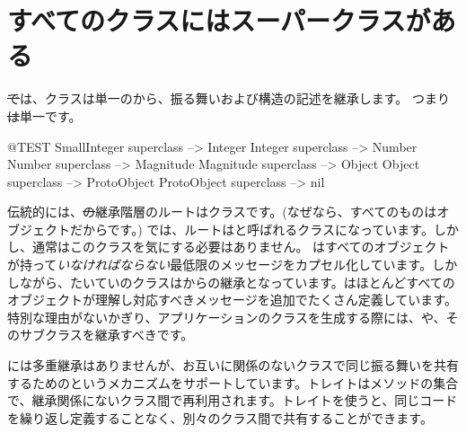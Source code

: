 \documentclass[a4paper,10pt,twoside]{book}
\begin{document}
\section{すべてのクラスにはスーパークラスがある}


\st では、クラスは単一のから、振る舞いおよび構造の記述を継承します。
つまり\st は単一です。

\begin{code}{@TEST}
SmallInteger superclass --> Integer
Integer superclass          --> Number
Number superclass        --> Magnitude
Magnitude superclass    --> Object
Object superclass           --> ProtoObject
ProtoObject superclass  --> nil
\end{code}

伝統的には、\st の継承階層のルートはクラスです。(なぜなら、すべてのものはオブジェクトだからです。)
\pharo では、ルートはと呼ばれるクラスになっています。しかし、通常はこのクラスを気にする必要はありません。 はすべてのオブジェクトが持って\emph{いなければならない}最低限のメッセージをカプセル化しています。しかしながら、たいていのクラスはからの継承となっています。はほとんどすべてのオブジェクトが理解し対応すべきメッセージを追加でたくさん定義しています。特別な理由がないかぎり、アプリケーションのクラスを生成する際には、や、そのサブクラスを継承すべきです。



\pharo には多重継承はありませんが、お互いに関係のないクラスで同じ振る舞いを共有するためのというメカニズムをサポートしています。トレイトはメソッドの集合で、継承関係にないクラス間で再利用されます。トレイトを使うと、同じコードを繰り返し定義することなく、別々のクラス間で共有することができます。
\end{document}
